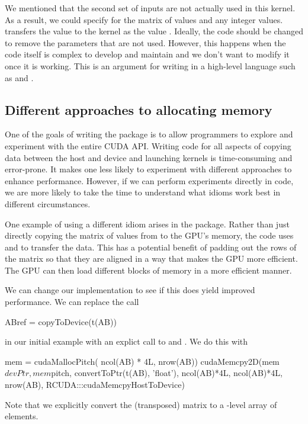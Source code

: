 We mentioned that the second set of inputs are not actually used in
this kernel. As a result, we could specify \Rnull{} for the matrix
of values and any integer values.   transfers the \R{}
value to the kernel as the \C{} value \Cnull.
Ideally, the code should be changed to remove the parameters that are
not used. However, this happens when the code itself is complex to
develop and maintain and we don't want to modify it once it is working.
This is an argument for writing in a high-level
language such as \R{} and .


\begin{comment}
Timings
See runDistTimes.R
For $224,970,001$ distances (14999^2),
R's \Rfunc{dist} takes 285.6 seconds (elapsed time).
On the Tesla K20, it takes 8.47 seconds.
This is is a speed-up factor of 33.7. And we see about 33 - 35 on different runs.
\end{comment}

\subsection{Different approaches to allocating memory} 
One of the goals of writing the  package
is to allow \R{} programmers to explore and experiment
with the entire CUDA API. 
Writing \C{} code for all aspects of copying data between
the host and device and launching kernels is time-consuming and error-prone.
It makes one less likely to experiment with different approaches to
enhance performance. However, if we can perform experiments directly
in  \R{} code, we are more likely to take the time to understand what
idioms work best in different circumstances.

One example of using a different idiom arises in the 
package. Rather than just directly copying the matrix of values from
\R{} to the GPU's memory, the \C{} code uses 
and  to transfer the data.  This has a potential
benefit of padding out the rows of the matrix so that they are aligned
in a way that makes the GPU more efficient. The GPU can then load
different blocks of memory in a more efficient manner.

We can change our implementation  to see if this does yield 
improved performance.
We can replace the call 
\begin{RCode}
ABref = copyToDevice(t(AB))
\end{RCode}
in our initial example with an explict
call to  and .
We do this with
\begin{RCode}
mem = cudaMallocPitch( ncol(AB) * 4L,  nrow(AB))
cudaMemcpy2D(mem$devPtr, mem$pitch, 
             convertToPtr(t(AB), 'float'), 
             ncol(AB)*4L, ncol(AB)*4L, nrow(AB),
             RCUDA:::cudaMemcpyHostToDevice)
\end{RCode}
Note that we explicitly convert the (transposed)
matrix to a \C-level array of  elements.


